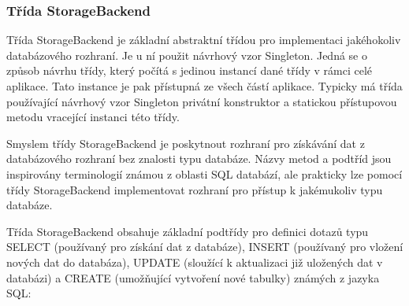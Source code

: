 \subsubsection{Třída StorageBackend}

Třída StorageBackend je základní abstraktní třídou pro implementaci jakéhokoliv databázového rozhraní.
Je u ní použit návrhový vzor Singleton. %
Jedná se o způsob návrhu třídy, který počítá s jedinou instancí dané třídy v rámci celé aplikace.
Tato instance je pak přístupná ze všech částí aplikace. Typicky má třída používající návrhový
vzor Singleton privátní konstruktor a statickou přístupovou metodu vracející instanci této třídy.

Smyslem třídy StorageBackend je poskytnout rozhraní pro získávání dat z databázového rozhraní bez znalosti
typu databáze. Názvy metod a podtříd jsou inspirovány terminologií známou z
oblasti SQL databází, %
 ale prakticky
lze pomocí třídy StorageBackend implementovat rozhraní pro přístup k jakémukoliv typu databáze.

Třída StorageBackend obsahuje základní podtřídy pro definici dotazů typu SELECT (používaný pro získání
dat z databáze), INSERT (používaný pro vložení nových dat do databáza), UPDATE (sloužící k aktualizaci
již uložených dat v databázi) a CREATE (umožňující vytvoření nové tabulky) známých z jazyka SQL:

